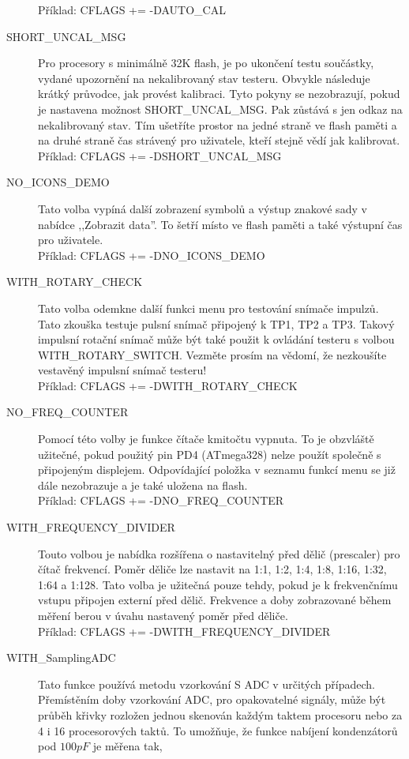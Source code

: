 \begin{description}
Příklad: CFLAGS += -DAUTO\_CAL
  \item[SHORT\_UNCAL\_MSG] Pro procesory s minimálně 32K flash, je po ukončení testu součástky, vydané
upozornění na nekalibrovaný stav testeru.
Obvykle následuje krátký průvodce, jak provést kalibraci.
Tyto pokyny se nezobrazují, pokud je nastavena možnost SHORT\_UNCAL\_MSG.
Pak zůstává s jen odkaz na nekalibrovaný stav.
Tím ušetříte prostor na jedné straně ve flash paměti a na druhé straně čas strávený pro uživatele,
kteří stejně vědí jak kalibrovat.\\
Příklad: CFLAGS += -DSHORT\_UNCAL\_MSG
 \item[NO\_ICONS\_DEMO]
Tato volba vypíná další zobrazení symbolů a výstup znakové sady v nabídce
,,Zobrazit data''.
To šetří místo ve flash paměti a také výstupní čas pro uživatele.\\
Příklad: CFLAGS += -DNO\_ICONS\_DEMO
 \item[WITH\_ROTARY\_CHECK]
Tato volba odemkne další funkci menu pro testování snímače impulzů.
Tato zkouška testuje pulsní snímač připojený k TP1, TP2 a TP3.
Takový impulsní rotační snímač může být také použit k ovládání testeru s volbou WITH\_ROTARY\_SWITCH.
Vezměte prosím na vědomí, že nezkoušíte vestavěný impulsní snímač testeru!\\
Příklad: CFLAGS += -DWITH\_ROTARY\_CHECK
 \item[NO\_FREQ\_COUNTER]
Pomocí této volby je funkce čítače kmitočtu vypnuta.
To je obzvláště užitečné, pokud použitý pin PD4 (ATmega328) nelze použít společně s
připojeným displejem.
Odpovídající položka v seznamu funkcí menu se již dále nezobrazuje a je také uložena na flash.\\
Příklad: CFLAGS += -DNO\_FREQ\_COUNTER
 \item[WITH\_FREQUENCY\_DIVIDER]
Touto volbou je nabídka rozšířena o nastavitelný před dělič (prescaler) pro čítač frekvencí.
Poměr děliče lze nastavit na 1:1, 1:2, 1:4, 1:8, 1:16, 1:32, 1:64 a 1:128.
Tato volba je užitečná pouze tehdy, pokud je k frekvenčnímu vstupu připojen externí před dělič.
Frekvence a doby zobrazované během měření berou v úvahu nastavený poměr před děliče.\\
Příklad: CFLAGS += -DWITH\_FREQUENCY\_DIVIDER
  \item[WITH\_SamplingADC] Tato funkce používá metodu vzorkování S ADC v určitých případech.
Přemístěním doby vzorkování ADC, pro opakovatelné signály, může být průběh křivky rozložen jednou
skenován každým taktem procesoru nebo za 4 i 16 procesorových taktů.
To umožňuje, že funkce nabíjení kondenzátorů pod \(100pF\) je měřena tak,

\end{description}
